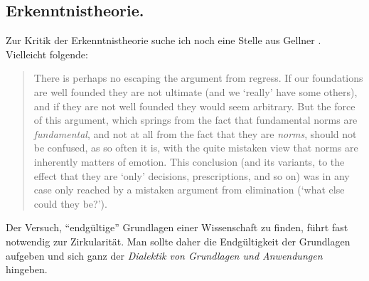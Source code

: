 \documentclass[a4paper, 10pt]{amsart}
\begin{document}
\subsection{Erkenntnistheorie.}
Zur Kritik der Erkenntnistheorie suche ich noch eine Stelle aus Gellner \cite{gellner1979legitimation}. Vielleicht folgende:
%
\begin{quotation}
There is perhaps no escaping the argument from regress. If our foundations are well founded they are not ultimate (and we `really' have some others), and if they are not well founded they would seem arbitrary. But the force of this argument, which springs from the fact that fundamental norms are \emph{fundamental}, and not at all from the fact that they are \emph{norms}, should not be confused, as so often it is, with the quite mistaken view that norms are inherently matters of emotion. This conclusion (and its variants, to the effect that they are `only' decisions, prescriptions, and so on) was in any case only reached by a mistaken argument from elimination (`what else could they be?').
\end{quotation}
%
Der Versuch, ``endgültige'' Grundlagen einer Wissenschaft zu finden, führt fast notwendig zur Zirkularität. Man sollte daher die Endgültigkeit der Grundlagen aufgeben und sich ganz der \emph{Dialektik von Grundlagen und Anwendungen} hingeben.
\end{document}
